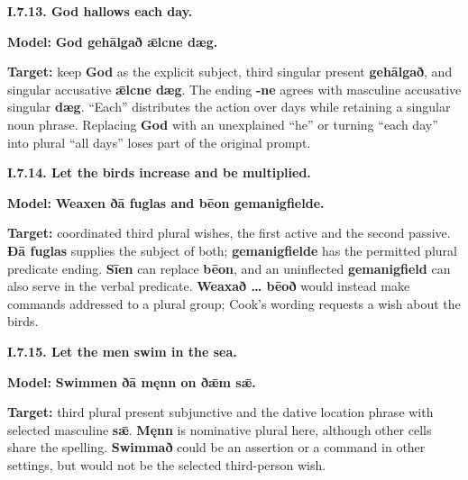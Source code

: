 \par\begin{minipage}{\linewidth}\raggedright
\textbf{I.7.13. God hallows each day.}

\textbf{Model:} \textbf{God gehālgað ǣlcne dæg.}

\textbf{Target:} keep \textbf{God} as the explicit subject, third singular present \textbf{gehālgað}, and singular accusative \textbf{ǣlcne dæg}. The ending \textbf{-ne} agrees with masculine accusative singular \textbf{dæg}. “Each” distributes the action over days while retaining a singular noun phrase. Replacing \textbf{God} with an unexplained “he” or turning “each day” into plural “all days” loses part of the original prompt.

\end{minipage}\par\addvspace{4pt}

\par\begin{minipage}{\linewidth}\raggedright
\textbf{I.7.14. Let the birds increase and be multiplied.}

\textbf{Model:} \textbf{Weaxen ðā fuglas and bēon gemanigfielde.}

\textbf{Target:} coordinated third plural wishes, the first active and the second passive. \textbf{Ðā fuglas} supplies the subject of both; \textbf{gemanigfielde} has the permitted plural predicate ending. \textbf{Sīen} can replace \textbf{bēon}, and an uninflected \textbf{gemanigfield} can also serve in the verbal predicate. \textbf{Weaxað … bēoð} would instead make commands addressed to a plural group; Cook’s wording requests a wish about the birds.

\end{minipage}\par\addvspace{4pt}

\par\begin{minipage}{\linewidth}\raggedright
\textbf{I.7.15. Let the men swim in the sea.}

\textbf{Model:} \textbf{Swimmen ðā męnn on ðǣm sǣ.}

\textbf{Target:} third plural present subjunctive and the dative location phrase with selected masculine \textbf{sǣ}. \textbf{Męnn} is nominative plural here, although other cells share the spelling. \textbf{Swimmað} could be an assertion or a command in other settings, but would not be the selected third-person wish.

\end{minipage}\par\addvspace{4pt}

